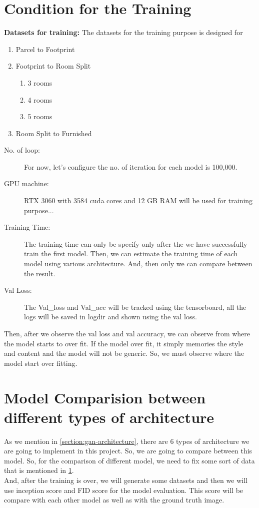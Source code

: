         \section{Condition for the Training}\label{section:conditionfortraining}
            \textbf{Datasets for training:} 
            The datasets for the training purpose is designed for 
            \begin{enumerate}[label=\alph*.]
                \item Parcel to Footprint\cite{footprint}
                \item Footprint to Room Split
                \begin{enumerate}[label=\roman*.]
                    \item 3 rooms
                    \item 4 rooms
                    \item 5 rooms
                \end{enumerate}
                \item Room Split to Furnished
            \end{enumerate}
           \begin{description}
               \item[No. of loop: ] For now, let's configure the no. of iteration for each model is 100,000.
               \item[GPU machine: ]  RTX 3060 with 3584 cuda cores and 12 GB RAM will be used for training purpose...
               \item[Training Time:] The training time can only be specify only after the we have successfully train the first model. Then, we can estimate the training time of each model using various architecture. And, then only we can compare between the result.
               \item[Val Loss:] The Val\_loss and Val\_acc will be tracked using the tensorboard, all the logs will be saved in logdir and shown using the val loss.
           \end{description}
            Then, after we observe the val loss and val accuracy, we can observe from where the model starts to over fit. 
            If the model over fit, it simply memories the style and content and the model will not be generic. So, we must observe where the model start over fitting. 
        \section{Model Comparision between different types of architecture}
            As we mention in \ref{section:gan-architecture}, there are 6 types of architecture we are going to implement in this project. So, we are going to compare between this model. So, for the comparison of different model, we need to fix some sort of data that is mentioned in \ref{section:conditionfortraining}. \\
            And, after the training is over, we will generate some datasets and then we will use inception score and FID score for the model evaluation. This score will be compare with each other model as well as with the ground truth image.
